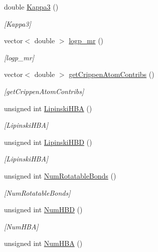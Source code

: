 \begin{DoxyCompactItemize}
double \mbox{\hyperlink{class_molecule_a46bf5206450f9a17bd2c256a7f37ab8b}{Kappa3}} ()
\begin{DoxyCompactList}\small\item\em \mbox{[}Kappa3\mbox{]} \end{DoxyCompactList}\item 
vector$<$ double $>$ \mbox{\hyperlink{class_molecule_ae3e5569d45cb96dbf1636d55e69273d4}{logp\+\_\+mr}} ()
\begin{DoxyCompactList}\small\item\em \mbox{[}logp\+\_\+mr\mbox{]} \end{DoxyCompactList}\item 
vector$<$ double $>$ \mbox{\hyperlink{class_molecule_a89046a3437790e24581fd2958d49c544}{get\+Crippen\+Atom\+Contribs}} ()
\begin{DoxyCompactList}\small\item\em \mbox{[}get\+Crippen\+Atom\+Contribs\mbox{]} \end{DoxyCompactList}\item 
unsigned int \mbox{\hyperlink{class_molecule_aae854241373a2539a0b9421b8d295dd6}{Lipinski\+H\+BA}} ()
\begin{DoxyCompactList}\small\item\em \mbox{[}Lipinski\+H\+BA\mbox{]} \end{DoxyCompactList}\item 
unsigned int \mbox{\hyperlink{class_molecule_a5b22fcdafd01813f7a554f42dad03aea}{Lipinski\+H\+BD}} ()
\begin{DoxyCompactList}\small\item\em \mbox{[}Lipinski\+H\+BA\mbox{]} \end{DoxyCompactList}\item 
unsigned int \mbox{\hyperlink{class_molecule_a1185b821c895d5bfd39d194570749524}{Num\+Rotatable\+Bonds}} ()
\begin{DoxyCompactList}\small\item\em \mbox{[}Num\+Rotatable\+Bonds\mbox{]} \end{DoxyCompactList}\item 
unsigned int \mbox{\hyperlink{class_molecule_a67cebe5aa58856c930fa1b162e592956}{Num\+H\+BD}} ()
\begin{DoxyCompactList}\small\item\em \mbox{[}Num\+H\+BA\mbox{]} \end{DoxyCompactList}\item 
unsigned int \mbox{\hyperlink{class_molecule_a932d2464d1d351fca8e72cd160bde74f}{Num\+H\+BA}} ()

\end{DoxyCompactItemize}
